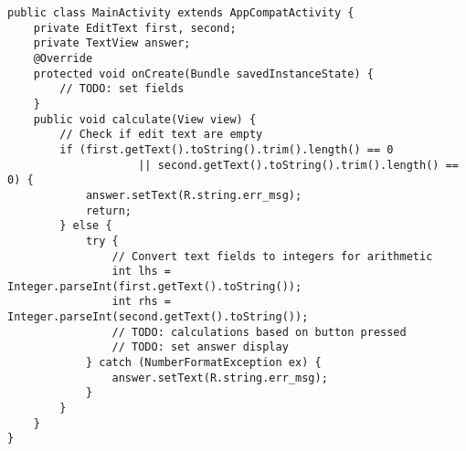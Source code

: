 \begin{lstlisting}[style=A_Java, caption={Assignment template}, label={listing:asigtemp}]
public class MainActivity extends AppCompatActivity {
    private EditText first, second;
    private TextView answer;
    @Override 
    protected void onCreate(Bundle savedInstanceState) {
        // TODO: set fields
    }
    public void calculate(View view) {
        // Check if edit text are empty
        if (first.getText().toString().trim().length() == 0
                    || second.getText().toString().trim().length() == 0) {
            answer.setText(R.string.err_msg);
            return;
        } else {
            try {
                // Convert text fields to integers for arithmetic
                int lhs = Integer.parseInt(first.getText().toString());
                int rhs = Integer.parseInt(second.getText().toString());
                // TODO: calculations based on button pressed
                // TODO: set answer display
            } catch (NumberFormatException ex) {
                answer.setText(R.string.err_msg);
            }
        }
    }
}
\end{lstlisting}
